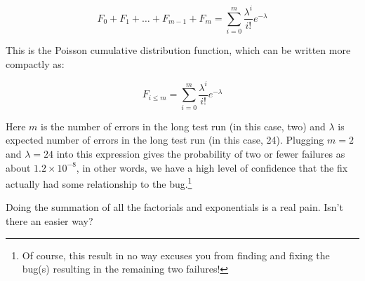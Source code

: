 \begin{equation}
	F_0 + F_1 + \dots + F_{m - 1} + F_m =
		\sum_{i=0}^m \frac{\lambda^i}{i!} e^{-\lambda}
\end{equation}

This is the Poisson cumulative distribution function, which can be
written more compactly as:

\begin{equation}
	F_{i \le m} = \sum_{i=0}^m \frac{\lambda^i}{i!} e^{-\lambda}
\label{eq:debugging:Possion CDF}
\end{equation}

Here $m$ is the number of errors in the long test run
(in this case, two) and $\lambda$ is expected number of errors
in the long test run (in this case, 24).
Plugging $m=2$ and $\lambda=24$ into this expression gives the probability
of two or fewer failures as about
$1.2 \times 10^{-8}$, in other words, we have a high level of confidence
that the fix actually had some relationship to the bug.\footnote{
	Of course, this result in no way excuses you from finding and
	fixing the bug(s) resulting in the remaining two failures!}

\QuickQuiz{}
	Doing the summation of all the factorials and exponentials
	is a real pain.
	Isn't there an easier way?
 \QuickQuizEnd


